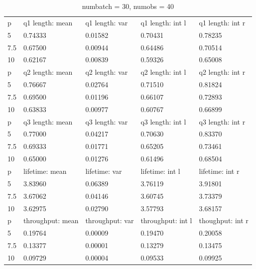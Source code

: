 \documentclass[a4paper,11pt]{article}
\begin{document}
\begin{table}[H]
    \begin{tabular}{lllll}
    \rowcolor{LightPurple}
    p & q1 length: mean & q1 length: var & q1 length: int l & q1 length: int r \\
    \rowcolor{Gray}
    5 & 0.74333 & 0.01582 & 0.70431 & 0.78235 \\
    7.5 & 0.67500 & 0.00944 & 0.64486 & 0.70514 \\
    \rowcolor{LightCyan}
    10 & 0.62167 & 0.00839 & 0.59326 & 0.65008 \\
    \rowcolor{LightPurple}
    p & q2 length: mean & q2 length: var & q2 length: int l & q2 length: int r \\
    \rowcolor{Gray}
    5 & 0.76667 & 0.02764 & 0.71510 & 0.81824 \\
    7.5 & 0.69500 & 0.01196 & 0.66107 & 0.72893 \\
    \rowcolor{LightCyan}
    10 & 0.63833 & 0.00977 & 0.60767 & 0.66899 \\
    \rowcolor{LightPurple}
    p & q3 length: mean & q3 length: var & q3 length: int l & q3 length: int r \\
    \rowcolor{Gray}
    5 & 0.77000 & 0.04217 & 0.70630 & 0.83370 \\ 
    7.5 & 0.69333 & 0.01771 & 0.65205 & 0.73461 \\
    \rowcolor{LightCyan}
    10 & 0.65000 & 0.01276 & 0.61496 & 0.68504 \\ 
    \rowcolor{LightPurple}
    p & lifetime: mean & lifetime: var & lifetime: int l & lifetime: int r \\
    \rowcolor{Gray}
    5 & 3.83960 & 0.06389 & 3.76119 & 3.91801 \\
    7.5 & 3.67062 & 0.04146 & 3.60745 & 3.73379 \\
    \rowcolor{LightCyan}
    10 & 3.62975 & 0.02790 & 3.57793 & 3.68157 \\
    \rowcolor{LightPurple}
    p & throughput: mean & throughput: var & throughput: int l & thoughput: int r \\
    \rowcolor{Gray}
    5 & 0.19764 & 0.00009 & 0.19470 & 0.20058 \\
    7.5 & 0.13377 & 0.00001 & 0.13279 & 0.13475 \\
    \rowcolor{LightCyan}
    10 & 0.09729 & 0.00004 & 0.09533 & 0.09925 \\
\end{tabular}
\caption{numbatch = 30, numobs = 40} \label{tab:tab1}
\end{table}
\end{document}
